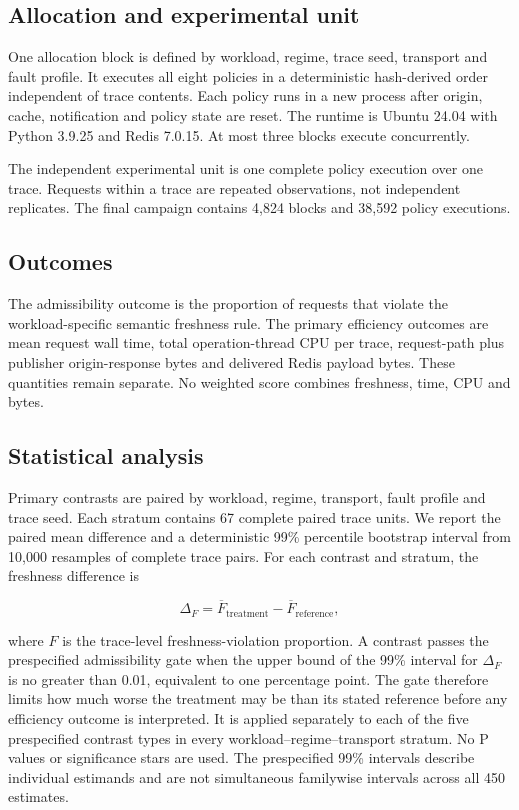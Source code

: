 \documentclass[pdflatex,sn-mathphys-num]{sn-jnl}
\begin{document}
\subsection{Allocation and experimental unit}\label{allocation-and-experimental-unit}

One allocation block is defined by workload, regime, trace seed, transport and fault profile. It executes all eight policies in a deterministic hash-derived order independent of trace contents. Each policy runs in a new process after origin, cache, notification and policy state are reset. The runtime is Ubuntu 24.04 with Python 3.9.25 and Redis 7.0.15. At most three blocks execute concurrently.

The independent experimental unit is one complete policy execution over one trace. Requests within a trace are repeated observations, not independent replicates. The final campaign contains 4,824 blocks and 38,592 policy executions.

\subsection{Outcomes}\label{outcomes}

The admissibility outcome is the proportion of requests that violate the workload-specific semantic freshness rule. The primary efficiency outcomes are mean request wall time, total operation-thread CPU per trace, request-path plus publisher origin-response bytes and delivered Redis payload bytes. These quantities remain separate. No weighted score combines freshness, time, CPU and bytes.

\subsection{Statistical analysis}\label{statistical-analysis}

Primary contrasts are paired by workload, regime, transport, fault profile and trace seed. Each stratum contains 67 complete paired trace units. We report the paired mean difference and a deterministic 99\% percentile bootstrap interval from 10,000 resamples of complete trace pairs. For each contrast and stratum, the freshness difference is

\[
\Delta_F = \overline{F}_{\mathrm{treatment}}-\overline{F}_{\mathrm{reference}},
\]

where \(F\) is the trace-level freshness-violation proportion. A contrast passes the prespecified admissibility gate when the upper bound of the 99\% interval for \(\Delta_F\) is no greater than 0.01, equivalent to one percentage point. The gate therefore limits how much worse the treatment may be than its stated reference before any efficiency outcome is interpreted. It is applied separately to each of the five prespecified contrast types in every workload--regime--transport stratum. No P values or significance stars are used. The prespecified 99\% intervals describe individual estimands and are not simultaneous familywise intervals across all 450 estimates.
\end{document}
